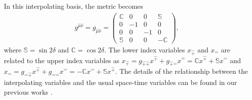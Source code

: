 \documentclass[foundations,article,submit,pdftex,moreauthors]{Definitions/mdpi}
\begin{document}
 In this interpolating basis, the metric becomes
\begin{align}\label{eqn:g_munu_interpolation}
  g^{\hat{\mu}\hat{\nu}}
  = g_{\hat{\mu}\hat{\nu}}
  =
  \begin{pmatrix}
    \mathbb{C} & 0  & 0  & \mathbb{S} \\
    0 & -1 & 0  & 0 \\
    0 & 0  & -1 & 0 \\
    \mathbb{S} & 0  & 0  & -\mathbb{C}
  \end{pmatrix},
\end{align}
where $\mathbb{S}=\sin2\delta$ and $\mathbb{C}=\cos2\delta$. The lower index variables $x_{\hat{+}}$ and $x_{\hat{-}}$ are related to the upper index variables as $x_{\hat{+}}=g_{\hat{+}\hat{+}}x^{\hat{+}}+g_{\hat{+}\hat{-}}x^{\hat{-}}=\mathbb{C}x^{\hat{+}}+\mathbb{S}x^{\hat{-}}$ and $x_{\hat{-}}=g_{\hat{-}\hat{+}}x^{\hat{+}}+g_{\hat{-}\hat{-}}x^{\hat{-}}=-\mathbb{C}x^{\hat{-}}+\mathbb{S}x^{\hat{+}}$.
The details of the relationship between the
interpolating variables and the usual space-time variables
can be found in our previous works  \cite{Ji2001, Ravikumar:2021xck, Hornbostel1992, Ji1996, Ji2012, Ji2015EM, Ji2015SP, Ji2018QED, Ji2021QCD, Ji-Hari-2026-PRD}.
\end{document}
